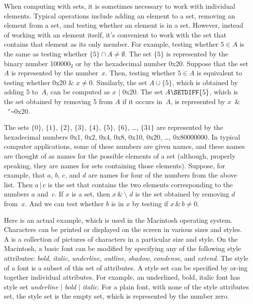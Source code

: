 \medbreak

When computing with sets, it is sometimes necessary to work
with individual elements.  Typical operations include adding
an element to a set, removing an element from a set, and
testing whether an element is in a set.  However, instead of
working with an element itself, it's convenient to work with
the set that contains that element as its only member.  For example,
testing whether $5\in A$ is the same as testing whether
$\{5\}\cap A\not=\emptyset$.  The set $\{5\}$ is represented by
the binary number 100000$_2$ or by the hexadecimal number 0x20.
Suppose that the set $A$ is represented by the number~$x$.
Then, testing whether $5\in A$ is equivalent to testing
whether 0x20 $\&$ $x\not=0$.  Similarly, the set
$A\cup\{5\}$, which is obtained by adding 5 to~$A$, can
be computed as $x$ $|$ 0x20.  The set $A\SETDIFF \{5\}$,
which is the set obtained by removing 5 from $A$ if it occurs in~$A$,
is represented by \hbox{$x$ $\&$ \texttt{\char`\~}0x20}.

The sets $\{0\}$, $\{1\}$, $\{2\}$, $\{3\}$, $\{4\}$, $\{5\}$, $\{6\}$, \dots, $\{31\}$ are
represented by the hexadecimal numbers 0x1, 0x2, 0x4, 0x8, 0x10, 0x20, \dots, 0x80000000. 
In typical computer applications, some of these numbers are given names,
and these names are thought of as names for the possible elements of a set
(although, properly speaking, they are names for sets containing those elements).
Suppose, for example, that $a$, $b$, $c$, and $d$ are names for four of the
numbers from the above list.  Then $a\,|\,c$ is the set that contains
the two elements corresponding to the numbers $a$ and~$c$.  If $x$ is a
set, then $x\,\&\,\texttt{\char`\~}d$ is the set obtained by removing
$d$ from~$x$.  And we can test whether $b$ is in $x$ by testing if
$x\,\&\,b\not=0$.

Here is an actual example, which is used in the Macintosh operating system.
Characters can be printed or displayed on the screen in various sizes and
styles.  A  is a collection of pictures of characters in a particular
size and style.  On the Macintosh, a basic font can be modified by 
specifying any of the following style attributes: \textit{bold},
\textit{italic}, \textit{underline}, \textit{outline}, \textit{shadow}, 
\textit{condense}, and \textit{extend}.  The style of a font is a subset
of this set of attributes.  A style set can be specified by
or-ing together individual attributes.  For example, an underlined, bold, italic
font has style set \textit{underline} $|$ \textit{bold} $|$ \textit{italic}.
For a plain font, with none of the style attributes set, the style set
is the empty set, which is represented by the number zero.

